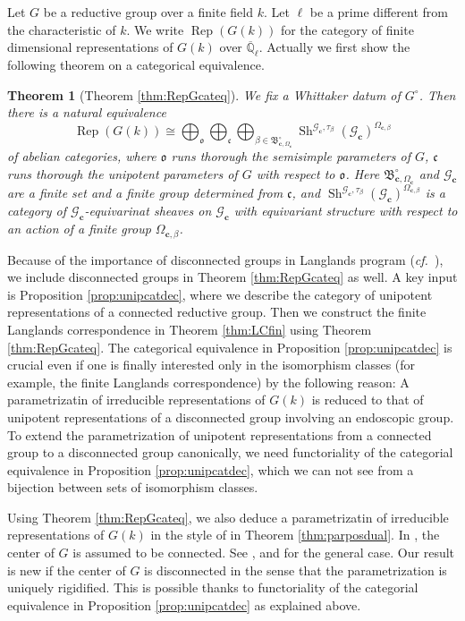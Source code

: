 \documentclass[12pt,a4paper]{article}
\newtheorem{thm}{Theorem}[section]
\DeclareMathOperator{\Rep}{Rep}
\DeclareMathOperator{\Sh}{Sh}
\newcommand{\cf}{\textit{cf.\ }}
\newcommand{\mb}{\mathbb}
\newcommand{\mc}{\mathcal}
\newcommand{\mf}{\mathfrak}
\newcommand{\mbf}{\mathbf}
\newcommand{\ol}{\overline}
\begin{document}
Let $G$ be a reductive group over a finite field $k$. 
Let $\ell$ be a prime different from the characteristic of $k$. We write $\Rep (G(k))$ for the category of finite dimensional representations of $G(k)$ over $\ol{\mb{Q}}_{\ell}$.  
Actually we first show the following theorem on a categorical equivalence. 
\begin{thm}[Theorem \ref{thm:RepGcateq}]
	We fix a Whittaker datum of $G^{\circ}$. 
	Then there is a natural equivalence 
	\[
	\Rep (G(k)) \cong \bigoplus_{\mf{o}} \bigoplus_{\mf{c}}
	\bigoplus_{\beta \in \mf{B}_{\mbf{c},\Omega_{\mbf{c}}}^{\circ}} \Sh^{\mc{G}_{\mbf{c}},\tau_{\beta}}(\mc{G}_{\mbf{c}})^{\Omega_{\mbf{c},\beta}}
	\]
	of abelian categories, where $\mf{o}$ runs thorough the semisimple parameters of $G$, $\mf{c}$ runs thorough the unipotent parameters of $G$ with respect to $\mf{o}$. 
Here $\mf{B}_{\mbf{c},\Omega_{\mbf{c}}}^{\circ}$ and $\mc{G}_{\mbf{c}}$ are a finite set and a finite group determined from $\mf{c}$, 
and $\Sh^{\mc{G}_{\mbf{c}},\tau_{\beta}}(\mc{G}_{\mbf{c}})^{\Omega_{\mbf{c},\beta}}$ is a category of $\mc{G}_{\mbf{c}}$-equivarinat sheaves on $\mc{G}_{\mbf{c}}$ with equivariant structure with respect to an action of a finite group $\Omega_{\mbf{c},\beta}$. 
	\end{thm}
Because of the importance of disconnected groups in Langlands program (\cf \cite{KalLLCdis}), we include disconnected groups in Theorem \ref{thm:RepGcateq} as well. 
A key input is Proposition \ref{prop:unipcatdec}, where we describe the category of unipotent representations of a connected reductive group. 
Then we construct the finite Langlands correspondence in 
Theorem \ref{thm:LCfin} using Theorem \ref{thm:RepGcateq}. 
The categorical equivalence in Proposition \ref{prop:unipcatdec} is crucial even if one is finally interested only in the isomorphism classes (for example, the finite Langlands correspondence) by the following reason: 
A parametrizatin of irreducible representations of $G(k)$ is reduced to that of unipotent representations of a disconnected group involving an endoscopic group. 
To extend the parametrization of unipotent representations from a connected group to a disconnected group canonically, we need functoriality of the categorial equivalence in Proposition \ref{prop:unipcatdec}, which we can not see from a bijection between sets of isomorphism classes. 

Using Theorem \ref{thm:RepGcateq}, we also deduce a parametrizatin of irreducible representations of $G(k)$ in the style of \cite{LusChred} in Theorem \ref{thm:parposdual}. In \cite[(13.2.1)]{LusChred}, the center of $G$ is assumed to be connected. See \cite{LusRepdis}, \cite{DiMiLuspar} and \cite{LusIrrSpin} for the general case.  
Our result is new if the center of $G$ is disconnected in the sense that the parametrization is uniquely rigidified. This is possible thanks to functoriality of the categorial equivalence in Proposition \ref{prop:unipcatdec} as explained above. 
\end{document}

